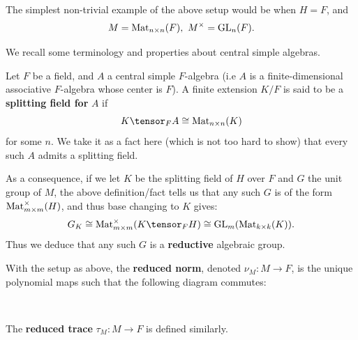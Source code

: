 \documentclass[11pt, x11names, openany]{book}
\begin{document}
\begin{example}
The simplest non-trivial example of the above setup would be when $H = F$, and 
\begin{equation*}
    M = \operatorname{Mat}_{n \times n}(F), \ M^\times = \operatorname{GL}_n(F).
\end{equation*}
\end{example}

We recall some terminology and properties about central simple algebras.

\begin{defn}
\label{def: CSA splitting field}
Let $F$ be a field, and $A$ a central simple $F$-algebra (i.e $A$ is a finite-dimensional associative $F$-algebra whose center is $F$). A finite extension $K/F$ is said to be a \textbf{splitting field for} $A$ if 
\begin{equation*}
    K \tensor_F A \cong \mat_{n \times n}(K)
\end{equation*}
for some $n$. We take it as a fact here (which is not too hard to show) that every such $A$ admits a splitting field.
\end{defn}

As a consequence, if we let $K$ be the splitting field of $H$ over $F$ and $G$ the unit group of $M$, the above definition/fact tells us that any such $G$ is of the form $\operatorname{Mat}_{m \times m}^\times(H)$, and thus base changing to $K$ gives:
\begin{equation*}
    G_K \cong \mat_{m \times m}^\times(K \tensor_F H) \cong \GL_{m}(\mat_{k \times k}(K)). 
\end{equation*}
Thus we deduce that any such $G$ is a \textbf{reductive} algebraic group. 

\begin{defn}
\label{def: reduced norm and trace}
With the setup as above, the \textbf{reduced norm}, denoted $\nu_M: M \to F$, is the unique polynomial maps such that the following diagram commutes:

\begin{center}
    \\
\end{center}

The \textbf{reduced trace} $\tau_M : M \to F$ is defined similarly.

\end{defn}
\end{document}
